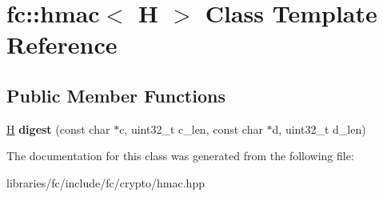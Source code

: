 \hypertarget{classfc_1_1hmac}{}\section{fc\+:\+:hmac$<$ H $>$ Class Template Reference}
\label{classfc_1_1hmac}
\subsection*{Public Member Functions}
\begin{DoxyCompactItemize}
\item 
\mbox{\label{classfc_1_1hmac_ae7f854720f2cbd191888ab47b0fe9983}} 
\mbox{\hyperlink{struct_h}{H}} {\bfseries digest} (const char $\ast$c, uint32\+\_\+t c\+\_\+len, const char $\ast$d, uint32\+\_\+t d\+\_\+len)
\end{DoxyCompactItemize}


The documentation for this class was generated from the following file\+:\begin{DoxyCompactItemize}
\item 
libraries/fc/include/fc/crypto/hmac.\+hpp\end{DoxyCompactItemize}
